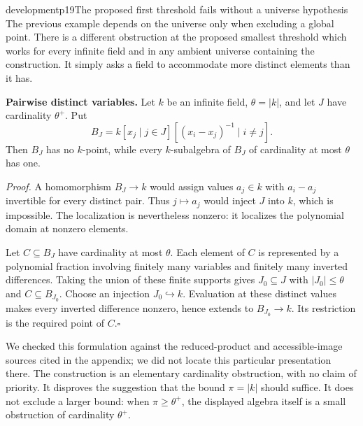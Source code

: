 \begin{dcomment}{development}{p19}{The proposed first threshold fails without a universe hypothesis}
The previous example depends on the universe only when excluding a global point. There is a different obstruction at the proposed smallest threshold which works for every infinite field and in any ambient universe containing the construction. It simply asks a field to accommodate more distinct elements than it has.

\textbf{Pairwise distinct variables.}\ours
Let $k$ be an infinite field, $\theta=|k|$, and let $J$ have cardinality $\theta^+$. Put
\[
 B_J=k[x_j\mid j\in J]
       [(x_i-x_j)^{-1}\mid i\ne j].
\]
Then $B_J$ has no $k$-point, while every $k$-subalgebra of $B_J$ of cardinality at most $\theta$ has one.

\emph{Proof.} A homomorphism $B_J\to k$ would assign values $a_j\in k$ with $a_i-a_j$ invertible for every distinct pair. Thus $j\mapsto a_j$ would inject $J$ into $k$, which is impossible. The localization is nevertheless nonzero: it localizes the polynomial domain at nonzero elements.

Let $C\subseteq B_J$ have cardinality at most $\theta$. Each element of $C$ is represented by a polynomial fraction involving finitely many variables and finitely many inverted differences. Taking the union of these finite supports gives $J_0\subseteq J$ with $|J_0|\le\theta$ and $C\subseteq B_{J_0}$. Choose an injection $J_0\hookrightarrow k$. Evaluation at these distinct values makes every inverted difference nonzero, hence extends to $B_{J_0}\to k$. Its restriction is the required point of $C$.\hfill$\square$

We checked this formulation against the reduced-product and accessible-image sources cited in the appendix; we did not locate this particular presentation there. The construction is an elementary cardinality obstruction, with no claim of priority. It disproves the suggestion that the bound $\pi=|k|$ should suffice. It does not exclude a larger bound: when $\pi\ge\theta^+$, the displayed algebra itself is a small obstruction of cardinality $\theta^+$.
\end{dcomment}

